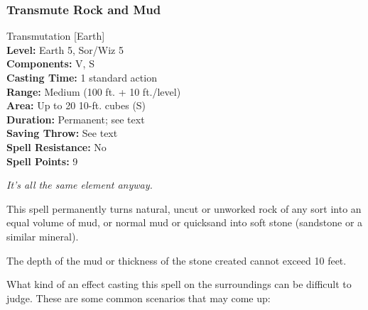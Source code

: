 \subsubsection{Transmute Rock and Mud}
\label{Spell:TransmuteRockAndMud}
Transmutation [Earth]
\\ \textbf{Level:} Earth 5, Sor/Wiz 5
\\ \textbf{Components:} V, S
\\ \textbf{Casting Time:} 1 standard action
\\ \textbf{Range:} Medium (100 ft. + 10 ft./level)
\\ \textbf{Area:} Up to 20 10-ft. cubes (S)
\\ \textbf{Duration:} Permanent; see text
\\ \textbf{Saving Throw:} See text
\\ \textbf{Spell Resistance:} No
\\ \textbf{Spell Points:} 9

\emph{It's all the same element anyway.}

This spell permanently turns natural, uncut or unworked rock of any sort into an equal volume of mud, or normal mud or quicksand into soft stone (sandstone or a similar mineral).

The depth of the mud or thickness of the stone created cannot exceed 10 feet. 

What kind of an effect casting this spell on the surroundings can be difficult to judge.
These are some common scenarios that may come up:

